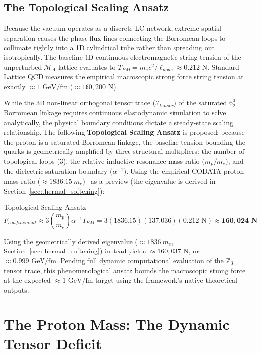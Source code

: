 \subsection{The Topological Scaling Ansatz}

Because the vacuum operates as a discrete LC network, extreme spatial separation causes the phase-flux lines connecting the Borromean loops to collimate tightly into a 1D cylindrical tube rather than spreading out isotropically. The baseline 1D continuous electromagnetic string tension of the unperturbed $\mathcal{M}_{A}$ lattice evaluates to $T_{EM}=m_{e}c^{2}/\ell_{node}\approx0.212\text{ N}$. Standard Lattice QCD measures the empirical macroscopic strong force string tension at exactly $\approx 1\text{ GeV/fm}$ ($\approx 160,200\text{ N}$). 

While the 3D non-linear orthogonal tensor trace ($\mathcal{I}_{tensor}$) of the saturated $6_2^3$ Borromean linkage requires continuous elastodynamic simulation to solve analytically, the physical boundary conditions dictate a steady-state scaling relationship. The following \textbf{Topological Scaling Ansatz} is proposed: because the proton is a saturated Borromean linkage, the baseline tension bounding the quarks is geometrically amplified by three structural multipliers: the number of topological loops (3), the relative inductive resonance mass ratio ($m_p/m_e$), and the dielectric saturation boundary ($\alpha^{-1}$). Using the empirical CODATA proton mass ratio ($\approx 1836.15 \ m_e$)~\cite{codata2018} as a preview (the eigenvalue is derived in Section~\ref{sec:thermal_softening}):

\begin{resultbox}{Topological Scaling Ansatz}
\begin{equation}
    F_{confinement} \approx 3\left(\frac{m_p}{m_e}\right)\alpha^{-1}T_{EM} = 3(1836.15)(137.036)(0.212\text{ N}) \approx \mathbf{160,024\text{ N}}
\end{equation}
\end{resultbox}
    
Using the geometrically derived eigenvalue ($\approx 1836\ m_e$, Section~\ref{sec:thermal_softening}) instead yields $\approx 160{,}037\text{ N}$, or $\approx 0.999\text{ GeV/fm}$. Pending full dynamic computational evaluation of the $\mathbb{Z}_3$ tensor trace, this phenomenological ansatz bounds the macroscopic strong force at the expected $\approx 1\text{ GeV/fm}$ target using the framework's native theoretical outputs.

\section{The Proton Mass: The Dynamic Tensor Deficit}

